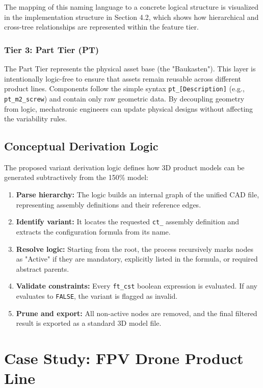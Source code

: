 \documentclass[runningheads]{llncs}
\begin{document}
The mapping of this naming language to a concrete logical structure is visualized in the implementation structure in Section 4.2, which shows how hierarchical and cross-tree relationships are represented within the feature tier.

\subsubsection{Tier 3: Part Tier (PT)}
The Part Tier represents the physical asset base (the "Baukasten"). This layer is intentionally logic-free to ensure that assets remain reusable across different product lines. Components follow the simple syntax \texttt{pt\_[Description]} (e.g., \texttt{pt\_m2\_screw}) and contain only raw geometric data. By decoupling geometry from logic, mechatronic engineers can update physical designs without affecting the variability rules.

\subsection{Conceptual Derivation Logic}

The proposed variant derivation logic defines how 3D product models can be generated subtractively from the 150\% model:

\begin{enumerate}
    \item \textbf{Parse hierarchy:} The logic builds an internal graph of the unified CAD file, representing assembly definitions and their reference edges.
    \item \textbf{Identify variant:} It locates the requested \texttt{ct\_} assembly definition and extracts the configuration formula from its name.
    \item \textbf{Resolve logic:} Starting from the root, the process recursively marks nodes as "Active" if they are mandatory, explicitly listed in the formula, or required abstract parents.
    \item \textbf{Validate constraints:} Every \texttt{ft\_cst} boolean expression is evaluated. If any evaluates to \texttt{FALSE}, the variant is flagged as invalid.
    \item \textbf{Prune and export:} All non-active nodes are removed, and the final filtered result is exported as a standard 3D model file.
\end{enumerate}

\section{Case Study: FPV Drone Product Line}
\end{document}
